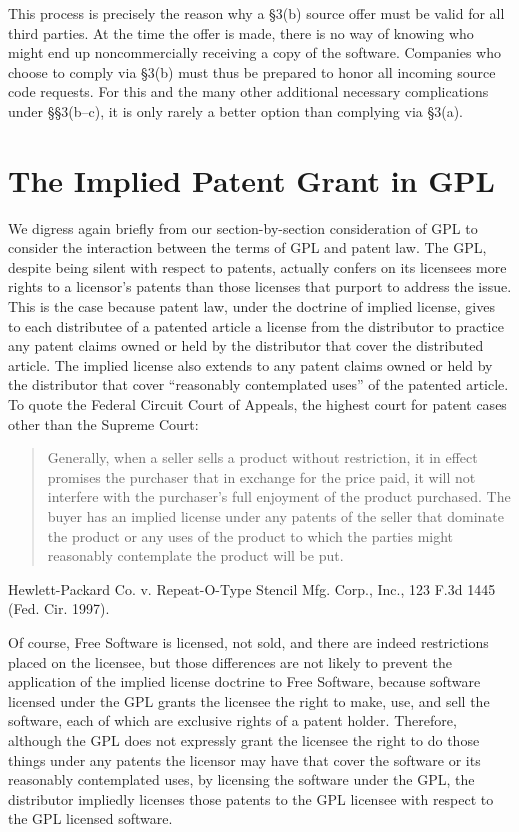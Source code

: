 \documentclass[11pt, letterpaper]{book}
\begin{document}
This process is precisely the reason why a \S 3(b) source offer must be
valid for all third parties. At the time the offer is made, there is no
way of knowing who might end up noncommercially receiving a copy of the
software. Companies who choose to comply via \S 3(b) must thus be
prepared to honor all incoming source code requests. For this and the
many other additional necessary complications under \S\S 3(b--c), it is
only rarely a better option than complying via \S 3(a).

\chapter{The Implied Patent Grant in GPL}

We digress again briefly from our section-by-section consideration of GPL
to consider the interaction between the terms of GPL and patent law. The
GPL, despite being silent with respect to patents, actually confers on its
licensees more rights to a licensor's patents than those licenses that
purport to address the issue. This is the case because patent law, under
the doctrine of implied license, gives to each distributee of a patented
article a license from the distributor to practice any patent claims owned
or held by the distributor that cover the distributed article. The
implied license also extends to any patent claims owned or held by the
distributor that cover ``reasonably contemplated uses'' of the patented
article. To quote the Federal Circuit Court of Appeals, the highest court
for patent cases other than the Supreme Court:

\begin{quotation}
Generally, when a seller sells a product without restriction, it in
effect promises the purchaser that in exchange for the price paid, it will
not interfere with the purchaser's full enjoyment of the product
purchased. The buyer has an implied license under any patents of the
seller that dominate the product or any uses of the product to which the
parties might reasonably contemplate the product will be put.
\end{quotation}
Hewlett-Packard Co. v. Repeat-O-Type Stencil Mfg. Corp., Inc., 123 F.3d
1445 (Fed. Cir. 1997).

Of course, Free Software is licensed, not sold, and there are indeed
restrictions placed on the licensee, but those differences are not likely
to prevent the application of the implied license doctrine to Free
Software, because software licensed under the GPL grants the licensee the
right to make, use, and sell the software, each of which are exclusive
rights of a patent holder. Therefore, although the GPL does not expressly
grant the licensee the right to do those things under any patents the
licensor may have that cover the software or its reasonably contemplated
uses, by licensing the software under the GPL, the distributor impliedly
licenses those patents to the GPL licensee with respect to the GPL
licensed software.
\end{document}
